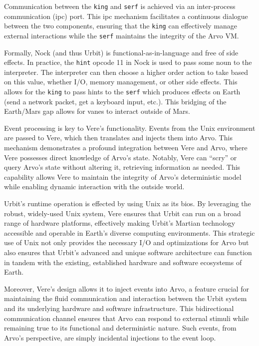 \documentclass[twoside]{article}
\begin{document}
Communication between the \texttt{king} and \texttt{serf} is achieved via an inter-process communication ({\sc ipc}) port.  This {\sc ipc} mechanism facilitates a continuous dialogue between the two components, ensuring that the \texttt{king} can effectively manage external interactions while the \texttt{serf} maintains the integrity of the Arvo VM.

Formally, Nock (and thus Urbit) is functional-as-in-language and free of side effects.  In practice, the \texttt{hint} opcode 11 in Nock is used to pass some noun to the interpreter.  The interpreter can then choose a higher order action to take based on this value, whether I/O, memory management, or other side effects.  This allows for the \texttt{king} to pass hints to the \texttt{serf} which produces effects on Earth (send a network packet, get a keyboard input, etc.).  This bridging of the Earth/Mars gap allows for vanes to interact outside of Mars.

Event processing is key to Vere's functionality.  Events from the Unix environment are passed to Vere, which then translates and injects them into Arvo.  This mechanism demonstrates a profound integration between Vere and Arvo, where Vere possesses direct knowledge of Arvo's state.  Notably, Vere can ``scry'' or query Arvo's state without altering it, retrieving information as needed.  This capability allows Vere to maintain the integrity of Arvo's deterministic model while enabling dynamic interaction with the outside world.

Urbit's runtime operation is effected by using Unix as its {\sc bios}.  By leveraging the robust, widely-used Unix system, Vere ensures that Urbit can run on a broad range of hardware platforms, effectively making Urbit's Martian technology accessible and operable in Earth's diverse computing environments.  This strategic use of Unix not only provides the necessary I/O and optimizations for Arvo but also ensures that Urbit's advanced and unique software architecture can function in tandem with the existing, established hardware and software eco\-systems of Earth.

Moreover, Vere's design allows it to inject events into Arvo, a feature crucial for maintaining the fluid communication and interaction between the Urbit system and its underlying hardware and software infrastructure.  This bidirectional communication channel ensures that Arvo can respond to external stimuli while remaining true to its functional and deterministic nature.  Such events, from Arvo's perspective, are simply incidental injections to the event loop.
\end{document}
